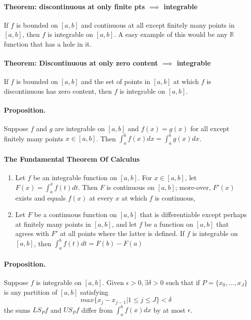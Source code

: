 \documentclass[11pt]{article}
\begin{document}
\paragraph{Theorem: discontinuous at only finite pts $\implies$ integrable} If $f$ is bounded on $[a,b]$ and continuous at all except finitely many points in $[a,b]$, then $f$ is integrable on $[a,b]$. A easy example of this would be any $\mathbb{R}$ function that has a hole in it.

\paragraph{Theorem: Discontinuous at only zero content $\implies$ integrable} If $f$ is bounded on $[a,b]$ and the set of points in $[a,b]$ at which $f$ is discontinuous has zero content, then $f$ is integrable on $[a,b]$.

\paragraph{Proposition.} Suppose $f$ and $g$ are integrable on $[a,b]$ and $f(x) = g(x)$ for all except finitely many points $x\in [a,b]$. Then $\int_a^bf(x)dx = \int_a^bg(x)dx$. 

\paragraph{The Fundamental Theorem Of Calculus}
\begin{enumerate}
    \item Let $f$ be an integrable function on $[a,b]$. For $x\in [a,b]$, let $F(x) = \int_a^xf(t)dt$. Then $F$ is continuous on $[a,b]$; more-over, $F'(x)$ exists and equals $f(x)$ at every $x$ at which $f$ is continuous,
    \item Let $F$ be a continuous function on $[a,b]$ that is differentiable except perhaps at finitely many points in $[a,b]$, and let $f$ be a function on $[a,b]$ that agrees with $F'$ at all points where the latter is defined. If $f$ is integrable on $[a,b]$, then $\int_a^bf(t)dt=F(b)-F(a)$
\end{enumerate}

\paragraph{Proposition.} Suppose $f$ is integrable on $[a,b]$. Given $\epsilon>0, \exists \delta > 0$ such that if $P= \{x_0,...,x_J\}$ is any partition of $[a,b]$ satisfying
\begin{equation*}
    max\{x_j-x_{j-1} | 1\leq j \leq J\} < \delta
\end{equation*}
the sums $LS_Pf$ and $US_Pf$ differ from $\int_a^bf(x)dx$ by at most $\epsilon$.
\end{document}
